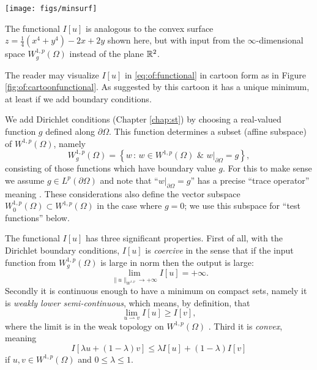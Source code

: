 \begin{marginfigure}
\texttt{[image: figs/minsurf]} %
\medskip
\caption{The functional $I[u]$ is analogous to the convex surface $z = \tfrac{1}{4}(x^4 + y^4) - 2x + 2y$ shown here, but with input from the $\infty$-dimensional space $W_g^{1,p}(\Omega)$ instead of the plane $\mathbb{R}^2$.}
\label{fig:of:cartoonfunctional}
\end{marginfigure}

The reader may visualize $I[u]$ in \eqref{eq:of:functional} in cartoon form as in Figure \ref{fig:of:cartoonfunctional}.  As suggested by this cartoon it has a unique minimum, at least if we add boundary conditions.

We add Dirichlet conditions (Chapter \ref{chap:st}) by choosing a real-valued function $g$ defined along $\partial \Omega$.  This function determines a subset (affine subspace) of $W^{1,p}(\Omega)$, namely
\begin{equation}
    W_g^{1,p}(\Omega) = \left\{w \,:\, w \in W^{1,p}(\Omega) \,\, \& \,\, w\big|_{\partial \Omega} = g\right\},  \label{eq:of:affinedirichlet}
\end{equation}
consisting of those functions which have boundary value $g$.  For this to make sense we assume $g \in L^p(\partial \Omega)$ and note that ``$w\big|_{\partial \Omega} = g$'' has a precise ``trace operator'' meaning \citep{Evans2010}.  These considerations also define the vector subspace $W_0^{1,p}(\Omega) \subset W^{1,p}(\Omega)$ in the case where $g=0$; we use this subspace for ``test functions'' below.

The functional $I[u]$ has three significant properties.  First of all, with the Dirichlet boundary conditions, $I[u]$ is \emph{coercive} in the sense that if the input function from $W_g^{1,p}(\Omega)$ is large in norm then the output is large:
\begin{equation}
\lim_{\|u\|_{W^{1,p}} \to +\infty} I[u] = +\infty.   \label{eq:of:coercivity}
\end{equation}
Secondly it is continuous enough to have a minimum on compact sets, namely it is \emph{weakly lower semi-continuous}, which means, by definition, that
\begin{equation}
\lim_{u\rightharpoonup v} I[u] \ge I[v],  \label{eq:of:lowersemicont}
\end{equation}
where the limit is in the weak topology on $W^{1,p}(\Omega)$ \citep{Evans2010,KinderlehrerStampacchia1980}.  Third it is \emph{convex}, meaning
\begin{equation}
I[\lambda u + (1-\lambda) v] \le \lambda I[u] + (1-\lambda) I[v]    \label{eq:of:convexity}
\end{equation}
if $u,v\in W^{1,p}(\Omega)$ and $0 \le \lambda \le 1$.

